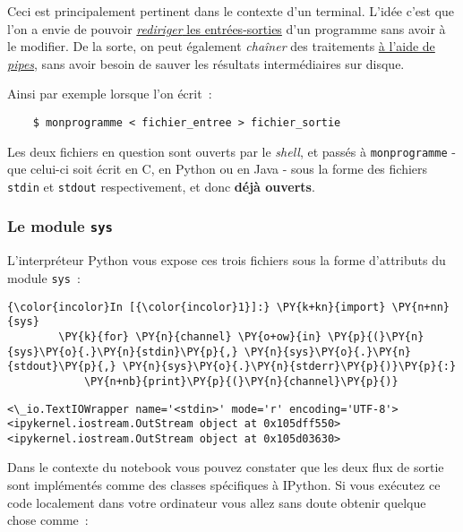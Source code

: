 Ceci est principalement pertinent dans le contexte d'un terminal. L'idée
c'est que l'on a envie de pouvoir
\href{http://en.wikipedia.org/wiki/Redirection_\%28computing\%29}{\emph{rediriger}
les entrées-sorties} d'un programme sans avoir à le modifier. De la
sorte, on peut également \emph{chaîner} des traitements
\href{http://en.wikipedia.org/wiki/Redirection_\%28computing\%29\#Piping}{à
l'aide de \emph{pipes}}, sans avoir besoin de sauver les résultats
intermédiaires sur disque.

    Ainsi par exemple lorsque l'on écrit~:

\begin{verbatim}
    $ monprogramme < fichier_entree > fichier_sortie
\end{verbatim}

Les deux fichiers en question sont ouverts par le \emph{shell}, et
passés à \texttt{monprogramme} - que celui-ci soit écrit en C, en Python
ou en Java - sous la forme des fichiers \texttt{stdin} et
\texttt{stdout} respectivement, et donc \textbf{déjà ouverts}.

    \hypertarget{le-module-sys}{%
\subsubsection{\texorpdfstring{Le module
\texttt{sys}}{Le module sys}}\label{le-module-sys}}

    L'interpréteur Python vous expose ces trois fichiers sous la forme
d'attributs du module \texttt{sys}~:

    \begin{Verbatim}[commandchars=\\\{\}]
{\color{incolor}In [{\color{incolor}1}]:} \PY{k+kn}{import} \PY{n+nn}{sys}
        \PY{k}{for} \PY{n}{channel} \PY{o+ow}{in} \PY{p}{(}\PY{n}{sys}\PY{o}{.}\PY{n}{stdin}\PY{p}{,} \PY{n}{sys}\PY{o}{.}\PY{n}{stdout}\PY{p}{,} \PY{n}{sys}\PY{o}{.}\PY{n}{stderr}\PY{p}{)}\PY{p}{:}
            \PY{n+nb}{print}\PY{p}{(}\PY{n}{channel}\PY{p}{)}
\end{Verbatim}


    \begin{Verbatim}[commandchars=\\\{\}]
<\_io.TextIOWrapper name='<stdin>' mode='r' encoding='UTF-8'>
<ipykernel.iostream.OutStream object at 0x105dff550>
<ipykernel.iostream.OutStream object at 0x105d03630>

    \end{Verbatim}

    Dans le contexte du notebook vous pouvez constater que les deux flux de
sortie sont implémentés comme des classes spécifiques à IPython. Si vous
exécutez ce code localement dans votre ordinateur vous allez sans doute
obtenir quelque chose comme~:

